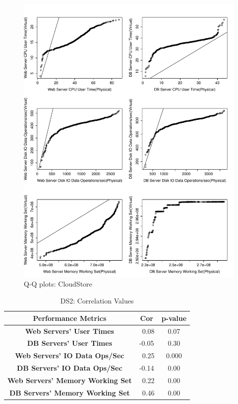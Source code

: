\begin{figure}[!htbp]
	\centering
	\includegraphics[width=1\textwidth]{cloudstore_qq.pdf}
	\caption{Q-Q plots: CloudStore}
	\captionsetup{justification=centering}
	\label{fig:Results Table}
\end{figure}


\begin{table}[!p]
	\begin{center}
			\caption{DS2: Correlation Values}
			\label{resultRQ3}
	\begin{tabular}{c|cc}
				\toprule
				\textbf{Performance Metrics}   & \textbf{Cor} & \textbf{p-value}\\  
				\midrule 
				\midrule 
				\textbf{Web Servers' User Times} & \ 0.08 & 0.07\\
				\textbf{DB Servers' User Times} & -0.05 & 0.30\\
				\midrule 
				\textbf{Web Servers' IO Data Ops/Sec}   &\ 0.25 & 0.000 \\
				\textbf{DB Servers' IO Data Ops/Sec} & -0.14 & 0.00\\
				\midrule 
				\textbf{Web Servers' Memory Working Set} &\ 0.22 & 0.00\\
				\textbf{DB Servers' Memory Working Set} &\ 0.46 & 0.00\\
				\bottomrule             
		\end{tabular}
	\end{center}
\end{table}
	
